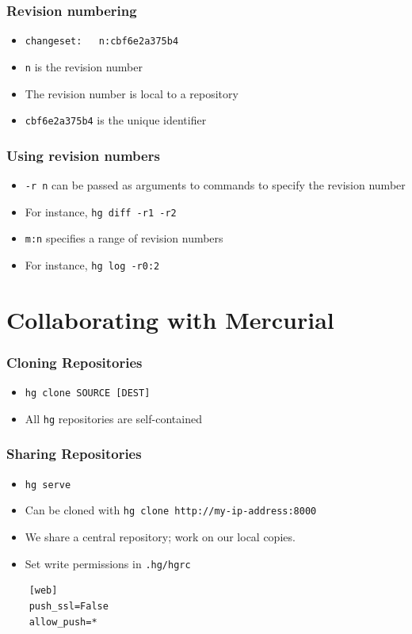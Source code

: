 \documentclass[14pt,compress]{beamer}
\newcommand{\typ}[1]{\lstinline{#1}}
\begin{document}
\begin{frame}[fragile]
  \frametitle{Revision numbering}
  \begin{itemize}
  \item \typ{changeset:   n:cbf6e2a375b4}
  \item \typ{n} is the revision number
  \item The revision number is local to a repository
  \item \typ{cbf6e2a375b4} is the unique identifier
  \end{itemize}
\end{frame}

\begin{frame}[fragile]
  \frametitle{Using revision numbers}
  \begin{itemize}
  \item \typ{-r n} can be passed as arguments to commands to specify
    the revision number
  \item For instance, \typ{hg diff -r1 -r2}
  \item \typ{m:n} specifies a range of revision numbers
  \item For instance, \typ{hg log -r0:2}
  \end{itemize}
\end{frame}

\section{Collaborating with Mercurial}
\begin{frame}[fragile]
  \frametitle{Cloning Repositories}
  \begin{itemize}
  \item \typ{hg clone SOURCE [DEST]}
  \item All \typ{hg} repositories are self-contained
  \end{itemize}
\end{frame}

\begin{frame}[fragile]
  \frametitle{Sharing Repositories}
  \begin{itemize}
  \item \typ{hg serve}
  \item Can be cloned with \typ{hg clone http://my-ip-address:8000}
  \item We share a central repository; work on our local copies. 
  \item Set write permissions in \typ{.hg/hgrc}
  \end{itemize}
  \begin{lstlisting}
    [web]
    push_ssl=False
    allow_push=*
  \end{lstlisting}
\end{frame}
\end{document}
